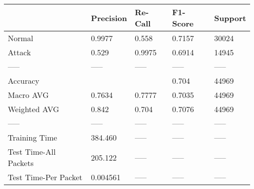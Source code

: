 \begin{tabular}{lllll}
\toprule
{} & Precision & Re-Call & F1-Score & Support \\
\midrule
Normal                &    0.9977 &   0.558 &   0.7157 &   30024 \\
Attack                &     0.529 &  0.9975 &   0.6914 &   14945 \\
-----                 &     ----- &   ----- &    ----- &   ----- \\
Accuracy              &           &         &    0.704 &   44969 \\
Macro AVG             &    0.7634 &  0.7777 &   0.7035 &   44969 \\
Weighted AVG          &     0.842 &   0.704 &   0.7076 &   44969 \\
-----                 &     ----- &   ----- &    ----- &   ----- \\
Training Time         &   384.460 &   ----- &    ----- &   ----- \\
Test Time-All Packets &   205.122 &   ----- &    ----- &   ----- \\
Test Time-Per Packet  &  0.004561 &   ----- &    ----- &   ----- \\
\bottomrule
\end{tabular}
